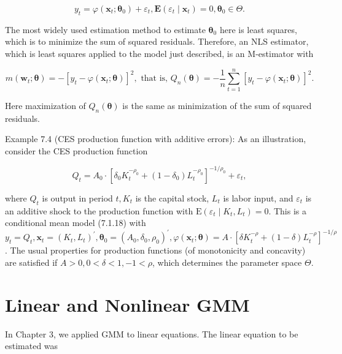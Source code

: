 \documentclass[10pt]{article}
\begin{document}
\begin{equation*}
y_{t}=\varphi\left(\mathbf{x}_{t} ; \boldsymbol{\theta}_{0}\right)+\varepsilon_{t}, \mathbf{E}\left(\varepsilon_{t} \mid \mathbf{x}_{t}\right)=0, \boldsymbol{\theta}_{0} \in \Theta . \tag{7.1.18}
\end{equation*}


The most widely used estimation method to estimate $\boldsymbol{\theta}_{0}$ here is least squares, which is to minimize the sum of squared residuals. Therefore, an NLS estimator, which is least squares applied to the model just described, is an M-estimator with


\begin{equation*}
m\left(\mathbf{w}_{t} ; \boldsymbol{\theta}\right)=-\left[y_{t}-\varphi\left(\mathbf{x}_{t} ; \boldsymbol{\theta}\right)\right]^{2}, \text { that is, } Q_{n}(\boldsymbol{\theta})=-\frac{1}{n} \sum_{t=1}^{n}\left[y_{t}-\varphi\left(\mathbf{x}_{t} ; \boldsymbol{\theta}\right)\right]^{2} . \tag{7.1.19}
\end{equation*}


Here maximization of $Q_{n}(\boldsymbol{\theta})$ is the same as minimization of the sum of squared residuals.

Example 7.4 (CES production function with additive errors): As an illustration, consider the CES production function


\begin{equation*}
Q_{t}=A_{0} \cdot\left[\delta_{0} K_{t}^{-\rho_{0}}+\left(1-\delta_{0}\right) L_{t}^{-\rho_{0}}\right]^{-1 / \rho_{0}}+\varepsilon_{t}, \tag{7.1.20}
\end{equation*}


where $Q_{t}$ is output in period $t, K_{t}$ is the capital stock, $L_{t}$ is labor input, and $\varepsilon_{t}$ is an additive shock to the production function with $\mathrm{E}\left(\varepsilon_{t} \mid K_{t}, L_{t}\right)=0$. This is a conditional mean model (7.1.18) with $y_{t}=Q_{t}, \mathbf{x}_{t}=\left(K_{t}, L_{t}\right)^{\prime}, \boldsymbol{\theta}_{0}= \left(A_{0}, \delta_{0}, \rho_{0}\right)^{\prime}, \varphi\left(\mathbf{x}_{t} ; \boldsymbol{\theta}\right)=A \cdot\left[\delta K_{t}^{-\rho}+(1-\delta) L_{t}^{-\rho}\right]^{-1 / \rho}$. The usual properties for production functions (of monotonicity and concavity) are satisfied if $A> 0,0<\delta<1,-1<\rho$, which determines the parameter space $\Theta$.

\section*{Linear and Nonlinear GMM}
In Chapter 3, we applied GMM to linear equations. The linear equation to be estimated was
\end{document}
